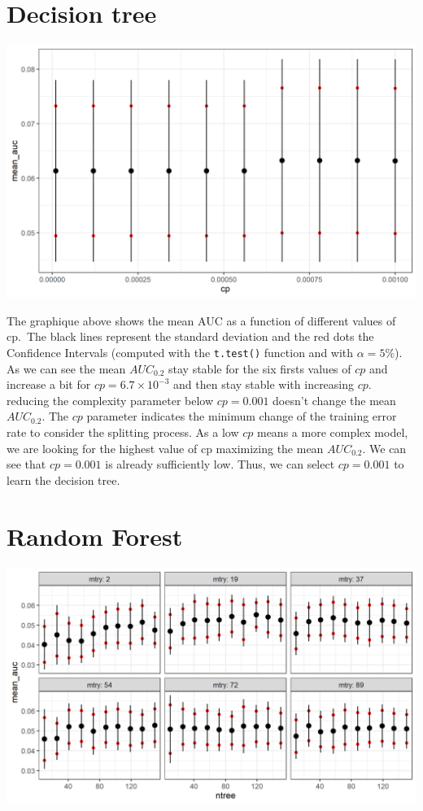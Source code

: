 \documentclass[
  12pt,
  oneside]{report}
\begin{document}
\hypertarget{decision-tree}{%
\section{Decision tree}\label{decision-tree}}

\includegraphics[width=30.15in]{data/cv_dt}

The graphique above shows the mean AUC as a function of different values of cp.~The black lines represent the standard deviation and the red dots the Confidence Intervals (computed with the \texttt{t.test()} function and with \(\alpha = 5\%\)).
As we can see the mean \(AUC_{0.2}\) stay stable for the six firsts values of \(cp\) and increase a bit for \(cp = 6.7\times10^{-3}\) and then stay stable with increasing \(cp\). reducing the complexity parameter below \(cp = 0.001\) doesn't change the mean \(AUC_{0.2}\). The \(cp\) parameter indicates the minimum change of the training error rate to consider the splitting process. As a low \(cp\) means a more complex model, we are looking for the highest value of cp maximizing the mean \(AUC_{0.2}\). We can see that \(cp = 0.001\) is already sufficiently low. Thus, we can select \(cp = 0.001\) to learn the decision tree.

\hypertarget{random-forest}{%
\section{Random Forest}\label{random-forest}}

\includegraphics[width=30.03in]{data/cv_rf}
\end{document}
